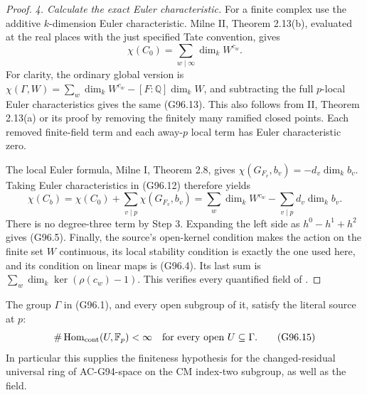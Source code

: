 \begin{proof}
\emph{4. Calculate the exact Euler characteristic.}
For a finite complex use the additive \(k\)-dimension Euler
characteristic.  Milne II, Theorem 2.13(b), evaluated at the real
places with the just specified Tate convention, gives
\[
             \chi(C_0)=\sum_{w\mid\infty}\dim_k W^{c_w}.
 \tag{G96.13}
\]
For clarity, the ordinary global version is
\(\chi(\Gamma,W)=\sum_w\dim_k W^{c_w}-[F:\mathbb Q]\dim_k W\),
and subtracting the full \(p\)-local Euler characteristics gives
the same (G96.13).  This also follows from II, Theorem 2.13(a)
or its proof by removing the finitely many ramified closed points.
Each removed finite-field term and each away-\(p\) local term
has Euler characteristic zero.

The local Euler formula, Milne I, Theorem 2.8, gives
\(\chi(G_{F_v},b_v)=-d_v\dim_k b_v\).
Taking Euler characteristics in (G96.12) therefore yields
\[
 \chi(C_b)=\chi(C_0)+\sum_{v\mid p}\chi(G_{F_v},b_v)
   =\sum_w\dim_k W^{c_w}-\sum_{v\mid p}d_v\dim_k b_v.
 \tag{G96.14}
\]
There is no degree-three term by Step 3.  Expanding the left
side as \(h^0-h^1+h^2\) gives (G96.5).
Finally, the source's open-kernel condition makes the action on
the finite set \(W\) continuous, its local stability condition is
exactly the one used here, and its condition on linear maps is
(G96.4).  Its last sum is \(\sum_w\dim_k\ker(\rho(c_w)-1)\).
This verifies every quantified field of .
\end{proof}

\begin{lemma}
\label{G96-phi-verification}
The group \(\Gamma\) in (G96.1), and every open subgroup of it,
satisfy the literal source  at \(p\):
\[
     \#\operatorname{Hom}_{\rm cont}(U,\mathbb F_p)<\infty
       \quad\text{for every open }U\subseteq\Gamma.
 \tag{G96.15}
\]
In particular this supplies the finiteness hypothesis for the
changed-residual universal ring of AC-G94-space on the CM
index-two subgroup, as well as the  field.
\end{lemma}

